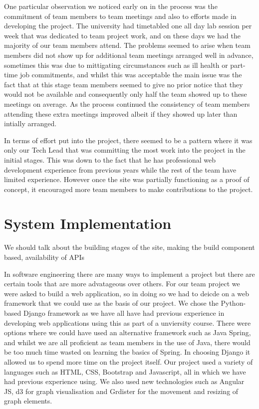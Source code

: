 \documentclass{l3proj}
\begin{document}
One particular observation we noticed early on in the process was the commitment of team members to team meetings and also
to efforts made in developing the project. The university had timetabled one all day lab session per week that was dedicated
to team project work, and on these days we had the majority of our team members attend. The problems seemed to arise when
team members did not show up for additional team meetings arranged well in advance, sometimes this was due to mittigating
circumstances such as ill health or part-time job commitments, and whilst this was acceptable the main issue was the fact
that at this stage team members seemed to give no prior notice that they would not be available and consequently only
half the team showed up to these meetings on average. As the process continued the consistency of team members attending these
extra meetings improved albeit if they showed up later than intially arranged.

In terms of effort put into the project, there seemed to be a pattern where it was only our Tech Lead that was committing the most
work into the project in the initial stages. This was down to the fact that he has professional web development experience from previous
years while the rest of the team have limited experience. However once the site was partially functioning as a proof of concept, it 
encouraged more team members to make contributions to the project.



\section{System Implementation}
\label{design}

We should talk about the building stages of the site, making the build component based, availability of APIs

In software engineering there are many ways to implement a project but there are certain tools that are more advatageous over
others. For our team project we were asked to build a web application, so in doing so we had to deicde on a web framework that
we could use as the basis of our project. We chose the Python-based Django framework as we have all have had previous experience
in developing web applications using this as part of a unviersity course. There were options where we could have used an alternative
framework such as Java Spring, and whilst we are all proficient as team members in the use of Java, there would be too much time
wasted on learning the basics of Spring. In choosing Django it allowed us to spend more time on the project itself. Our project
used a variety of languages such as HTML, CSS, Bootstrap and Javascript, all in which we have had previous experience using.
We also used new technologies such as Angular JS, d3 for graph visualisation and Grdister for the movement and resizing of graph
elements.
\end{document}
